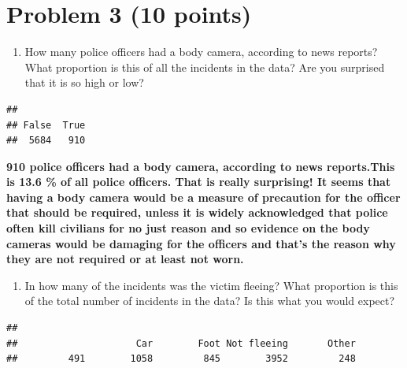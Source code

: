 \documentclass[
]{article}
\newenvironment{Shaded}{\begin{snugshade}}{\end{snugshade}}
\newcommand{\FunctionTok}[1]{\textcolor[rgb]{0.00,0.00,0.00}{#1}}
\newcommand{\NormalTok}[1]{#1}
\newcommand{\SpecialCharTok}[1]{\textcolor[rgb]{0.00,0.00,0.00}{#1}}
\providecommand{\tightlist}{%
  \setlength{\itemsep}{0pt}\setlength{\parskip}{0pt}}
\begin{document}
\hypertarget{problem-3-10-points}{%
\section{Problem 3 (10 points)}\label{problem-3-10-points}}

\begin{enumerate}
\def\labelenumi{\alph{enumi}.}
\tightlist
\item
  How many police officers had a body camera, according to news reports?
  What proportion is this of all the incidents in the data? Are you
  surprised that it is so high or low?
\end{enumerate}

\begin{Shaded}
\end{Shaded}

\begin{verbatim}
## 
## False  True 
##  5684   910
\end{verbatim}

\textbf{910 police officers had a body camera, according to news
reports.This is 13.6 \% of all police officers. That is really
surprising! It seems that having a body camera would be a measure of
precaution for the officer that should be required, unless it is widely
acknowledged that police often kill civilians for no just reason and so
evidence on the body cameras would be damaging for the officers and
that's the reason why they are not required or at least not worn. }

\begin{enumerate}
\def\labelenumi{\alph{enumi}.}
\setcounter{enumi}{1}
\tightlist
\item
  In how many of the incidents was the victim fleeing? What proportion
  is this of the total number of incidents in the data? Is this what you
  would expect?
\end{enumerate}

\begin{Shaded}
\end{Shaded}

\begin{verbatim}
## 
##                     Car        Foot Not fleeing       Other 
##         491        1058         845        3952         248
\end{verbatim}
\end{document}
